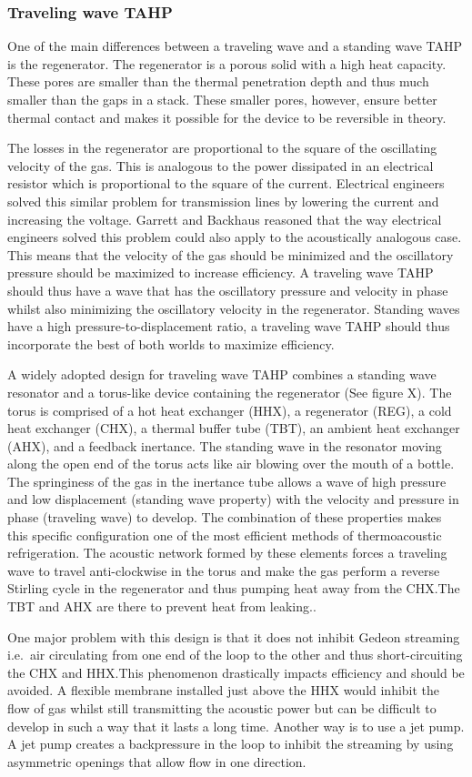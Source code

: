 \documentclass[a4paper]{article}
\newcommand{\newpara}
    {
      \bigbreak{}
      \noindent
    }
\begin{document}
\subsubsection{Traveling wave TAHP\cite{TARTIBU2019102}}
One of the main differences between a traveling wave and a standing wave TAHP is the regenerator. The regenerator is a porous solid with a high heat capacity. These pores are smaller than the thermal penetration depth and thus much smaller than the gaps in a stack. These smaller pores, however, ensure better thermal contact and makes it possible for the device to be reversible in theory.
\newpara{}
The losses in the regenerator are proportional to the square of the oscillating velocity of the gas. This is analogous to the power dissipated in an electrical resistor which is proportional to the square of the current. Electrical engineers solved this similar problem for transmission lines by lowering the current and increasing the voltage. Garrett and Backhaus\cite{powerofsound} reasoned that the way electrical engineers solved this problem could also apply to the acoustically analogous case. This means that the velocity of the gas should be minimized and the oscillatory pressure should be maximized to increase efficiency. A traveling wave TAHP should thus have a wave that has the oscillatory pressure and velocity in phase whilst also minimizing the oscillatory velocity in the regenerator. Standing waves have a high pressure-to-displacement ratio, a traveling wave TAHP should thus incorporate the best of both worlds to maximize efficiency.
\newpara{}
A widely adopted design for traveling wave TAHP combines a standing wave resonator and a torus-like device containing the regenerator (See figure X). The torus is comprised of a hot heat exchanger (HHX), a regenerator (REG), a cold heat exchanger (CHX), a thermal buffer tube (TBT), an ambient heat exchanger (AHX), and a feedback inertance. The standing wave in the resonator moving along the open end of the torus acts like air blowing over the mouth of a bottle. The springiness of the gas in the inertance tube allows a wave of high pressure and low displacement (standing wave property) with the velocity and pressure in phase (traveling wave) to develop. The combination of these properties makes this specific configuration one of the most efficient methods of thermoacoustic refrigeration. The acoustic network formed by these elements forces a traveling wave to travel anti-clockwise in the torus and make the gas perform a reverse Stirling cycle in the regenerator and thus pumping heat away from the CHX.\@ The TBT and AHX are there to prevent heat from leaking.\cite{TijaniAHighPerformanceThermoacousticEngine}.
\newpara{}
One major problem with this design is that it does not inhibit Gedeon streaming i.e.\ air circulating from one end of the loop to the other and thus short-circuiting the CHX and HHX.\@ This phenomenon drastically impacts efficiency and should be avoided. A flexible membrane installed just above the HHX would inhibit the flow of gas whilst still transmitting the acoustic power but can be difficult to develop in such a way that it lasts a long time. Another way is to use a jet pump. A jet pump creates a backpressure in the loop to inhibit the streaming by using asymmetric openings that allow flow in one direction.
\end{document}
